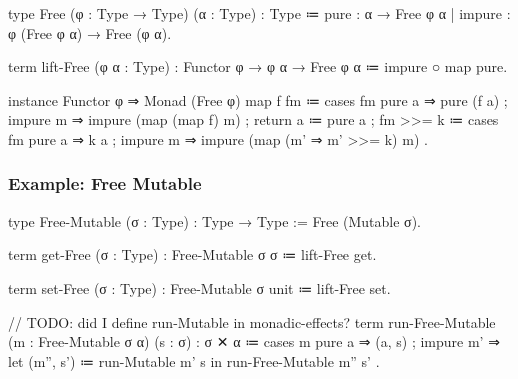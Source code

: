 

\begin{program}[caption={free monad}]
type Free (φ : Type → Type) (α : Type) : Type
  ≔ pure   : α → Free φ α
  | impure : φ (Free φ α) → Free (φ α).

%

term lift-Free (φ α : Type)
  : {Functor φ} → φ α → Free φ α
  ≔ impure ○ map pure.
\end{program}

\begin{program}
instance Functor φ ⇒ Monad (Free φ)
  { map f fm ≔ cases fm
                { pure a ⇒ pure (f a)
                ; impure m ⇒ impure (map (map f) m) }
  ; return a ≔ pure a
  ; fm >>= k ≔ cases fm
                  { pure a ⇒ k a
                  ; impure m ⇒ impure (map (m' ⇒ m' >>= k) m) } }.
\end{program}

\subsubsection{Example: Free Mutable}

\begin{program}
type Free-Mutable (σ : Type) : Type → Type := Free (Mutable σ).

term get-Free (σ : Type) : Free-Mutable σ σ
  ≔ lift-Free get.

term set-Free (σ : Type) : Free-Mutable σ unit
  ≔ lift-Free set.

// TODO: did I define run-Mutable in monadic-effects?
term run-Free-Mutable
      (m : Free-Mutable σ α) (s : σ)
  : σ ✕ α
  ≔ cases m
      { pure a ⇒ (a, s)
      ; impure m' ⇒ let (m'', s') ≔ run-Mutable m' s in
                     run-Free-Mutable m'' s' }.
\end{program}


